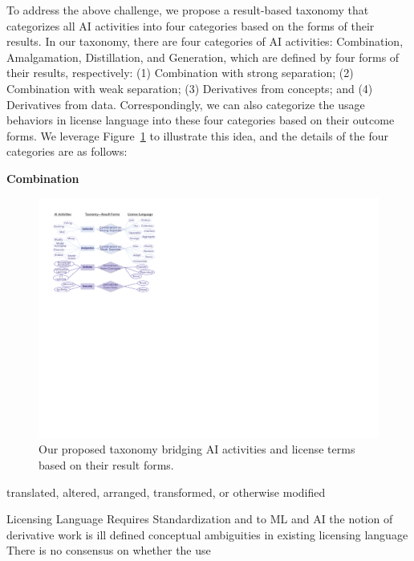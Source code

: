 To address the above challenge, we propose a result-based taxonomy that categorizes all AI activities into four categories based on the forms of their results. 
In our taxonomy, there are four categories of AI activities: Combination, Amalgamation, Distillation, and Generation, which are defined by four forms of their results, respectively: (1) Combination with strong separation; (2) Combination with weak separation; (3) Derivatives from concepts; and (4) Derivatives from data.
Correspondingly, we can also categorize the usage behaviors in license language into these four categories based on their outcome forms.
We leverage Figure~\ref{fig:tax} to illustrate this idea, and the details of the four categories are as follows:

\textbf{Combination}


\begin{figure}[t]
    \centering
    \includegraphics[width=\linewidth]{fig/taxonomy.pdf}
    \caption{Our proposed taxonomy bridging AI activities and license terms based on their result forms.}
    \Description{}
    \label{fig:tax}
\end{figure}

translated, altered, arranged, transformed, or otherwise modified 


Licensing Language Requires Standardization and  to ML and AI
the notion of derivative work is ill defined
conceptual ambiguities in existing licensing language
There is no consensus on whether the use

